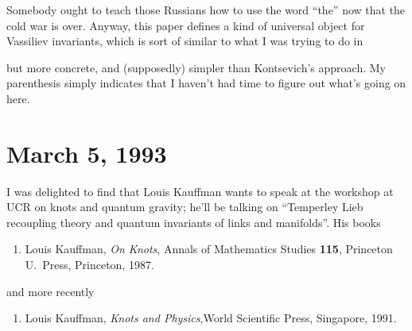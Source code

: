 \documentclass{article}
\def\tightlist{}
\renewcommand{\texttt}[1]{%
  \begingroup
  \ttfamily
  \begingroup\lccode`~=`/\lowercase{\endgroup\def~}{/\discretionary{}{}{}}%
  \begingroup\lccode`~=`[\lowercase{\endgroup\def~}{[\discretionary{}{}{}}%
  \begingroup\lccode`~=`.\lowercase{\endgroup\def~}{.\discretionary{}{}{}}%
  \catcode`/=\active\catcode`[=\active\catcode`.=\active
  \scantokens{#1\noexpand}%
  \endgroup
}
\begin{document}

Somebody ought to teach those Russians how to use the word ``the'' now
that the cold war is over. Anyway, this paper defines a kind of
universal object for Vassiliev invariants, which is sort of similar to
what I was trying to do in

\noindent
but more concrete, and (supposedly) simpler than Kontsevich's approach.
My parenthesis simply indicates that I haven't had time to figure out
what's going on here.


\hypertarget{week8}{%
\section{March 5, 1993}\label{week8}}

I was delighted to find that Louis Kauffman wants to speak at the
workshop at UCR on knots and quantum gravity; he'll be talking on
``Temperley Lieb recoupling theory and quantum invariants of links and
manifolds''. His books

\begin{enumerate}
\def\labelenumi{\arabic{enumi})}
\item
   Louis Kauffman, 
   \emph{On Knots}, Annals of Mathematics Studies \textbf{115}, Princeton
   U.\ Press, Princeton, 1987.
\end{enumerate}

and more recently

\begin{enumerate}
\def\labelenumi{\arabic{enumi})}
\setcounter{enumi}{1}
\item
    Louis Kauffman, 
  \emph{Knots and Physics},World Scientific Press, Singapore, 1991.
\end{enumerate}
\end{document}
